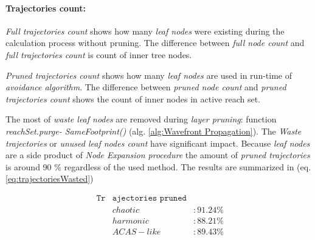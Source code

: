 \paragraph{Trajectories count:} \emph{Full trajectories count} shows how many \emph{leaf nodes} were existing during the calculation process without pruning. The difference between \emph{full node count} and \emph{full trajectories count} is count of inner tree nodes. 

\emph{Pruned trajectories count} shows how many \emph{leaf nodes} are used in run-time of \emph{avoidance algorithm}. The difference between \emph{pruned node count} and \emph{pruned trajectories count} shows the count of inner nodes in active reach set.

The most of \emph{waste leaf nodes} are removed during \emph{layer pruning}: function \emph{reachSet.purge- SameFootprint()} (alg. \ref{alg:Wavefront Propagation}). The \emph{Waste trajectories} or \emph{unused leaf nodes count} have significant impact. Because \emph{leaf nodes} are a side product of \emph{Node Expansion procedure} the amount of  \emph{pruned trajectories} is around 90 $\%$ regardless of the used method. The results are summarized in (eq. \ref{eq:trajectoriesWasted})

\begin{equation}\label{eq:trajectoriesWasted}
    \begin{aligned}
        \texttt{  Tr} & \texttt{ajectories } \texttt{pruned}\\
        &chaotic   &: 91.24 \%\\
        &harmonic  &: 88.21 \%\\
        &ACAS-like &: 89.43 \%
    \end{aligned}
\end{equation}


